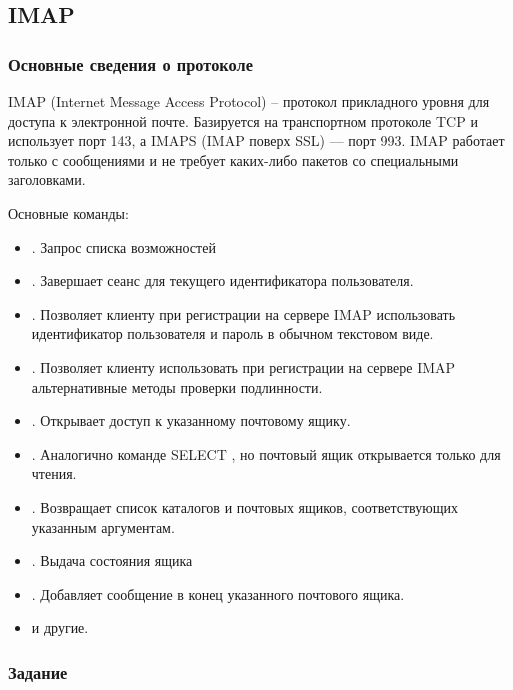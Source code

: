 

\subsection{IMAP}

\subsubsection{Основные сведения о протоколе}

IMAP (Internet Message Access Protocol) -- протокол прикладного уровня для доступа к электронной почте. Базируется на транспортном протоколе TCP и использует порт 143, а IMAPS (IMAP поверх SSL) — порт 993. IMAP работает только с сообщениями и не требует каких-либо пакетов со специальными заголовками.

Основные команды:

\begin{itemize}
	\item {}. Запрос списка возможностей
	\item {}. Завершает сеанс для текущего идентификатора пользователя.
	\item {}. Позволяет клиенту при регистрации на сервере IMAP использовать идентификатор пользователя и пароль в обычном текстовом виде.
	\item {}. Позволяет клиенту использовать при регистрации на сервере IMAP альтернативные методы проверки подлинности. 
	\item {}. Открывает доступ к указанному почтовому ящику.
	\item {}. Аналогично команде SELECT , но почтовый ящик открывается только для чтения.
	\item {}. Возвращает список каталогов и почтовых ящиков, соответствующих указанным аргументам.
	\item {}. Выдача состояния ящика
	\item {}. Добавляет сообщение в конец указанного почтового ящика.
	\item и другие.
\end{itemize}

\subsubsection{Задание}

